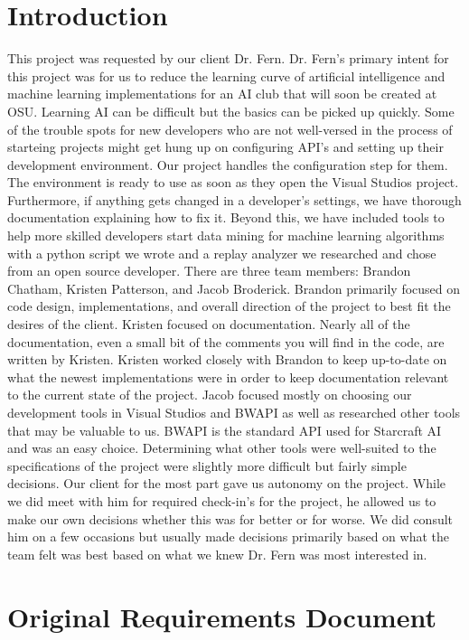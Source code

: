 \documentclass[10pt,letterpaper,onecolumn,draftclsnofoot]{IEEEtran}
\begin{document}
\section{Introduction}
	This project was requested by our client Dr. Fern. Dr. Fern's primary intent for this project was for us to reduce the learning curve of artificial intelligence and machine learning implementations for an AI club that will soon be created at OSU. Learning AI can be difficult but the basics can be picked up quickly. Some of the trouble spots for new developers who are not well-versed in the process of starteing projects might get hung up on configuring API's and setting up their development environment. Our project handles the configuration step for them. The environment is ready to use as soon as they open the Visual Studios project. Furthermore, if anything gets changed in a developer's settings, we have thorough documentation explaining how to fix it. Beyond this, we have included tools to help more skilled developers start data mining for machine learning algorithms with a python script we wrote and a replay analyzer we researched and chose from an open source developer. 
	There are three team members: Brandon Chatham, Kristen Patterson, and Jacob Broderick. Brandon primarily focused on code design, implementations, and overall direction of the project to best fit the desires of the client. Kristen focused on documentation. Nearly all of the documentation, even a small bit of the comments you will find in the code, are written by Kristen. Kristen worked closely with Brandon to keep up-to-date on what the newest implementations were in order to keep documentation relevant to the current state of the project. Jacob focused mostly on choosing our development tools in Visual Studios and BWAPI as well as researched other tools that may be valuable to us. BWAPI is the standard API used for Starcraft AI and was an easy choice. Determining what other tools were well-suited to the specifications of the project were slightly more difficult but fairly simple decisions. 
	Our client for the most part gave us autonomy on the project. While we did meet with him for required check-in's for the project, he allowed us to make our own decisions whether this was for better or for worse. We did consult him on a few occasions but usually made decisions primarily based on what the team felt was best based on what we knew Dr. Fern was most interested in.
\section{Original Requirements Document}
\end{document}

